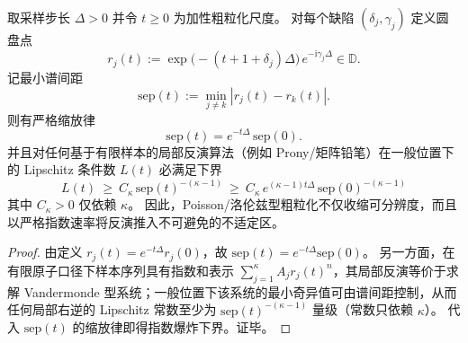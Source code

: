\begin{proposition}\label{prop:xi-coarsegraining-illposedness-exponential-law}
取采样步长 \(\Delta>0\) 并令 \(t\ge 0\) 为加性粗粒化尺度。
对每个缺陷 \((\delta_j,\gamma_j)\) 定义圆盘点
\[
r_j(t):=\exp\!\bigl(-(t+1+\delta_j)\Delta\bigr)\,e^{-\mathrm{i}\gamma_j\Delta}\in\mathbb{D}.
\]
记最小谱间距
\[
\mathrm{sep}(t):=\min_{j\ne k}|r_j(t)-r_k(t)|.
\]
则有严格缩放律
\[
\boxed{\;\mathrm{sep}(t)=e^{-t\Delta}\,\mathrm{sep}(0).\;}
\]
并且对任何基于有限样本的局部反演算法（例如 Prony/矩阵铅笔）在一般位置下的 Lipschitz 条件数 \(L(t)\) 必满足下界
\[
\boxed{\;
L(t)\ \ge\ C_\kappa\,\mathrm{sep}(t)^{-(\kappa-1)}
\ \ge\ C_\kappa\,e^{(\kappa-1)t\Delta}\,\mathrm{sep}(0)^{-(\kappa-1)}\;}
\]
其中 \(C_\kappa>0\) 仅依赖 \(\kappa\)。
因此，Poisson/洛伦兹型粗粒化不仅收缩可分辨度，而且以严格指数速率将反演推入不可避免的不适定区。
\end{proposition}
\begin{proof}
由定义 \(r_j(t)=e^{-t\Delta}r_j(0)\)，故 \(\mathrm{sep}(t)=e^{-t\Delta}\mathrm{sep}(0)\)。
另一方面，在有限原子口径下样本序列具有指数和表示 \(\sum_{j=1}^{\kappa}A_j r_j(t)^n\)，其局部反演等价于求解 Vandermonde 型系统；一般位置下该系统的最小奇异值可由谱间距控制，从而任何局部右逆的 Lipschitz 常数至少为 \(\mathrm{sep}(t)^{-(\kappa-1)}\) 量级（常数只依赖 \(\kappa\)）。
代入 \(\mathrm{sep}(t)\) 的缩放律即得指数爆炸下界。证毕。
\end{proof}


